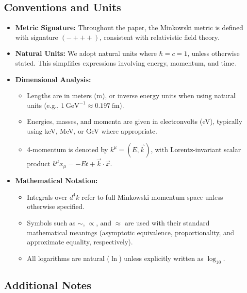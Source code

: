 \documentclass[12pt,a4paper]{article}
\begin{document}
\subsection*{Conventions and Units}

\begin{itemize}
    \item \textbf{Metric Signature:} Throughout the paper, the Minkowski metric is defined with signature \((- + + +)\), consistent with relativistic field theory.

    \item \textbf{Natural Units:} We adopt natural units where \(\hbar = c = 1\), unless otherwise stated. This simplifies expressions involving energy, momentum, and time.

    \item \textbf{Dimensional Analysis:}
    \begin{itemize}
        \item Lengths are in meters (m), or inverse energy units when using natural units (e.g., \(1~\mathrm{GeV}^{-1} \approx 0.197~\mathrm{fm}\)).
        \item Energies, masses, and momenta are given in electronvolts (eV), typically using keV, MeV, or GeV where appropriate.
        \item 4-momentum is denoted by \(k^\mu = (E, \vec{k})\), with Lorentz-invariant scalar product \(k^\mu x_\mu = -Et + \vec{k} \cdot \vec{x}\).
    \end{itemize}

    \item \textbf{Mathematical Notation:}
    \begin{itemize}
        \item Integrals over \(d^4k\) refer to full Minkowski momentum space unless otherwise specified.
        \item Symbols such as \(\sim\), \(\propto\), and \(\approx\) are used with their standard mathematical meanings (asymptotic equivalence, proportionality, and approximate equality, respectively).
        \item All logarithms are natural (\(\ln\)) unless explicitly written as \(\log_{10}\).
    \end{itemize}
\end{itemize}

\subsection*{Additional Notes}
\end{document}
